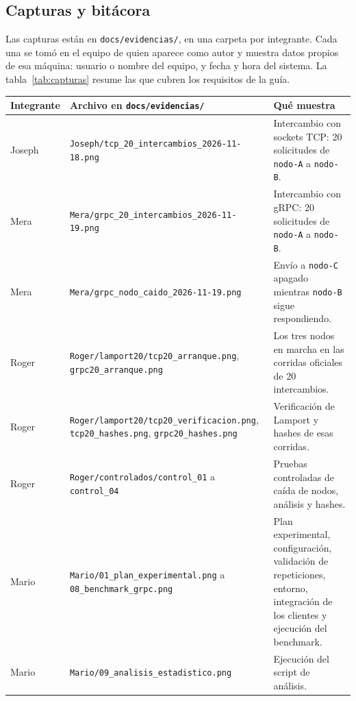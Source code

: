 \subsection{Capturas y bitácora}

Las capturas están en \texttt{docs/evidencias/}, en una carpeta por integrante. Cada una se tomó en el equipo de quien aparece como autor y muestra datos propios de esa máquina: usuario o nombre del equipo, y fecha y hora del sistema. La tabla~\ref{tab:capturas} resume las que cubren los requisitos de la guía.

\par\medskip
\noindent\begin{minipage}{\linewidth}
\centering
\small
\makeatletter{}\makeatother
\caption{Capturas de ejecución por integrante}
\label{tab:capturas}
\begin{tabularx}{\linewidth}{@{}l >{\raggedright\arraybackslash}p{5.4cm} >{\raggedright\arraybackslash}X@{}}
\toprule
Integrante & Archivo en \texttt{docs/evidencias/} & Qué muestra \\
\midrule
Joseph & \nolinkurl{Joseph/tcp_20_intercambios_2026-11-18.png} & Intercambio con sockets TCP: 20 solicitudes de \texttt{nodo-A} a \texttt{nodo-B}. \\
Mera & \nolinkurl{Mera/grpc_20_intercambios_2026-11-19.png} & Intercambio con gRPC: 20 solicitudes de \texttt{nodo-A} a \texttt{nodo-B}. \\
Mera & \nolinkurl{Mera/grpc_nodo_caido_2026-11-19.png} & Envío a \texttt{nodo-C} apagado mientras \texttt{nodo-B} sigue respondiendo. \\
Roger & \nolinkurl{Roger/lamport20/tcp20_arranque.png}, \nolinkurl{grpc20_arranque.png} & Los tres nodos en marcha en las corridas oficiales de 20 intercambios. \\
Roger & \nolinkurl{Roger/lamport20/tcp20_verificacion.png}, \nolinkurl{tcp20_hashes.png}, \nolinkurl{grpc20_hashes.png} & Verificación de Lamport y hashes de esas corridas. \\
Roger & \nolinkurl{Roger/controlados/control_01} a \nolinkurl{control_04} & Pruebas controladas de caída de nodos, análisis y hashes. \\
Mario & \nolinkurl{Mario/01_plan_experimental.png} a \nolinkurl{08_benchmark_grpc.png} & Plan experimental, configuración, validación de repeticiones, entorno, integración de los clientes y ejecución del benchmark. \\
Mario & \nolinkurl{Mario/09_analisis_estadistico.png} & Ejecución del script de análisis. \\
\bottomrule
\end{tabularx}
\end{minipage}
\par\medskip

